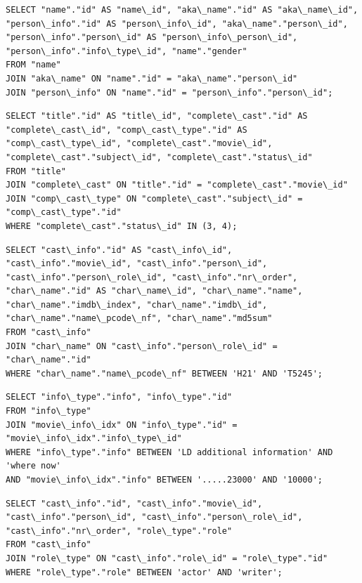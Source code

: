 \begin{appendices}
\begin{lstlisting}[caption={Query 8: Name, AKA Name, and Person Info Join}]
SELECT "name"."id" AS "name\_id", "aka\_name"."id" AS "aka\_name\_id", "person\_info"."id" AS "person\_info\_id", "aka\_name"."person\_id", "person\_info"."person\_id" AS "person\_info\_person\_id", "person\_info"."info\_type\_id", "name"."gender" 
FROM "name" 
JOIN "aka\_name" ON "name"."id" = "aka\_name"."person\_id" 
JOIN "person\_info" ON "name"."id" = "person\_info"."person\_id";
\end{lstlisting}

\begin{lstlisting}[caption={Query 9: Completed Cast Status}]
SELECT "title"."id" AS "title\_id", "complete\_cast"."id" AS "complete\_cast\_id", "comp\_cast\_type"."id" AS "comp\_cast\_type\_id", "complete\_cast"."movie\_id", "complete\_cast"."subject\_id", "complete\_cast"."status\_id" 
FROM "title" 
JOIN "complete\_cast" ON "title"."id" = "complete\_cast"."movie\_id" 
JOIN "comp\_cast\_type" ON "complete\_cast"."subject\_id" = "comp\_cast\_type"."id" 
WHERE "complete\_cast"."status\_id" IN (3, 4);
\end{lstlisting}

\begin{lstlisting}[caption={Query 10: Cast Info and Character Names}]
SELECT "cast\_info"."id" AS "cast\_info\_id", "cast\_info"."movie\_id", "cast\_info"."person\_id", "cast\_info"."person\_role\_id", "cast\_info"."nr\_order", "char\_name"."id" AS "char\_name\_id", "char\_name"."name", "char\_name"."imdb\_index", "char\_name"."imdb\_id", "char\_name"."name\_pcode\_nf", "char\_name"."md5sum" 
FROM "cast\_info" 
JOIN "char\_name" ON "cast\_info"."person\_role\_id" = "char\_name"."id" 
WHERE "char\_name"."name\_pcode\_nf" BETWEEN 'H21' AND 'T5245';
\end{lstlisting}

\begin{lstlisting}[caption={Query 11: Info Types and Movie Index}]
SELECT "info\_type"."info", "info\_type"."id" 
FROM "info\_type" 
JOIN "movie\_info\_idx" ON "info\_type"."id" = "movie\_info\_idx"."info\_type\_id" 
WHERE "info\_type"."info" BETWEEN 'LD additional information' AND 'where now' 
AND "movie\_info\_idx"."info" BETWEEN '.....23000' AND '10000';
\end{lstlisting}

\begin{lstlisting}[caption={Query 12: Actors and Writers}]
SELECT "cast\_info"."id", "cast\_info"."movie\_id", "cast\_info"."person\_id", "cast\_info"."person\_role\_id", "cast\_info"."nr\_order", "role\_type"."role" 
FROM "cast\_info" 
JOIN "role\_type" ON "cast\_info"."role\_id" = "role\_type"."id" 
WHERE "role\_type"."role" BETWEEN 'actor' AND 'writer';
\end{lstlisting}

\end{appendices}